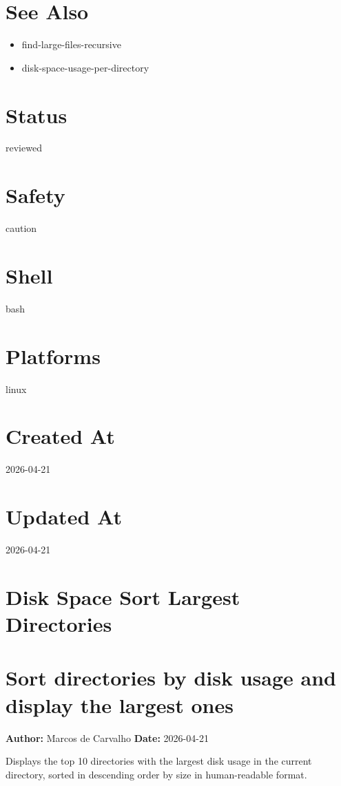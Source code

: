 \documentclass[openany]{book}
\begin{document}
\section*{See Also}
\begin{itemize}
  \item find-large-files-recursive
  \item disk-space-usage-per-directory
\end{itemize}

\section*{Status}
reviewed

\section*{Safety}
caution

\section*{Shell}
bash

\section*{Platforms}
linux

\section*{Created At}
2026-04-21

\section*{Updated At}
2026-04-21

\section{Disk Space Sort Largest Directories}
\section*{Sort directories by disk usage and display the largest ones}
\textbf{Author:} Marcos de Carvalho \hfill \textbf{Date:} 2026-04-21

\noindent Displays the top 10 directories with the largest disk usage in the current directory, sorted in descending order by size in human-readable format.
\end{document}
